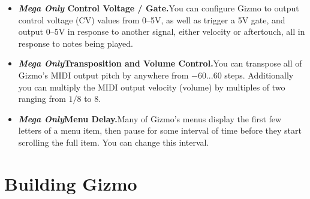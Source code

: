\documentclass{article}
\begin{document}
\begin{itemize}
\item {\bf  \textit{Mega Only} Control Voltage / Gate.}\quad You can configure Gizmo to output control voltage (CV) values from 0--5V, as well as trigger a 5V gate, and output 0--5V in response to another signal, either velocity or aftertouch, all in response to notes being played. 

\item {\bf \textit{Mega Only}\quad Transposition and Volume Control.}\quad You can transpose all of Gizmo's MIDI output pitch by anywhere from \(-60...60\) steps.  Additionally you can multiply the MIDI output velocity (volume) by multiples of two ranging from \(1/8\) to \(8\).

\item {\bf \textit{Mega Only}\quad Menu Delay.}\quad Many of Gizmo's menus display the first few letters of a menu item, then pause for some interval of time before they start scrolling the full item.  You can change this interval.

\end{itemize} 

\clearpage

\section{Building Gizmo}
\end{document}
